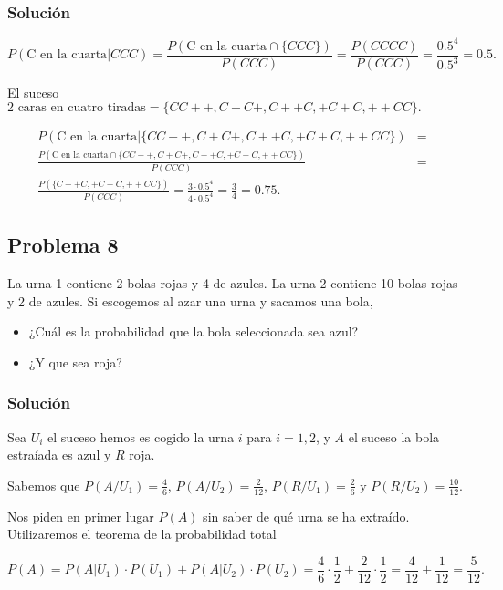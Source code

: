 \documentclass[
]{article}
\providecommand{\tightlist}{%
  \setlength{\itemsep}{0pt}\setlength{\parskip}{0pt}}
\begin{document}
\hypertarget{soluciuxf3n-7}{%
\subsubsection{Solución}\label{soluciuxf3n-7}}

\[
P(\mbox{C en la cuarta}|CCC)=
\frac{P(\mbox{C en la cuarta}\cap \{CCC\})}{P(CCC)}=
\frac{P(CCCC)}{P(CCC)}=\frac{0.5^4}{0.5^3}=0.5
.\]

El suceso
\(\mbox{2 caras en cuatro tiradas}=\{CC++,C+C+,C++C,+C+C,++CC\}.\)

\begin{eqnarray*}
P(\mbox{C en la cuarta}|\{CC++,C+C+,C++C,+C+C,++CC\})&=&\\
\frac{P(\mbox{C en la cuarta}\cap \{CC++,C+C+,C++C,+C+C,++CC\})}{P(CCC)}&=&\\
\frac{P(\{C++C,+C+C,++CC\})}{P(CCC)}=\frac{3\cdot 0.5^4}{4\cdot 0.5^4}=\frac{3}{4}=0.75.
\end{eqnarray*}

\hypertarget{problema-8}{%
\subsection{Problema 8}\label{problema-8}}

La urna 1 contiene 2 bolas rojas y 4 de azules. La urna 2 contiene 10
bolas rojas y 2 de azules. Si escogemos al azar una urna y sacamos una
bola,

\begin{itemize}
\tightlist
\item
  ¿Cuál es la probabilidad que la bola seleccionada sea azul?
\item
  ¿Y que sea roja?
\end{itemize}

\hypertarget{soluciuxf3n-8}{%
\subsubsection{Solución}\label{soluciuxf3n-8}}

Sea \(U_i\) el suceso hemos es cogido la urna \(i\) para \(i=1,2\), y
\(A\) el suceso la bola estraíada es azul y \(R\) roja.

Sabemos que \(P(A/U_1)=\frac{4}{6}\), \(P(A/U_2)=\frac{2}{12}\),
\(P(R/U_1)=\frac{2}{6}\) y \(P(R/U_2)=\frac{10}{12}.\)

Nos piden en primer lugar \(P(A)\) sin saber de qué urna se ha extraído.
Utilizaremos el teorema de la probabilidad total

\[
P(A)=P(A|U_1)\cdot P(U_1)+P(A|U_2)\cdot P(U_2)=
\frac{4}{6}\cdot \frac{1}{2}+\frac{2}{12}\cdot \frac{1}{2}
=\frac{4}{12}+\frac{1}{12}=\frac{5}{12}.
\]
\end{document}
